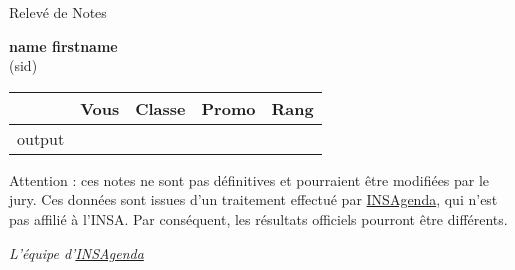 \documentclass[12pt, letterpaper, twoside]{article}
\begin{document}
\begin{center}
    {\huge Relevé de Notes}
    \vspace{1cm}

    \textbf{{name} {firstname}}\\
    ({sid})
    \vspace{.5cm}

    \begin{longtable}{ p{} r r r r }

        & \textbf{Vous} & \textbf{Classe} & \textbf{Promo} & \textbf{Rang} \\ \hline
        
        {output}
    \end{longtable}
\end{center}

\vspace{1cm}

Attention : ces notes ne sont pas définitives et pourraient être modifiées par le jury. Ces données sont issues d'un traitement effectué par \href{https://insagenda.fr/}{INSAgenda}, qui n'est pas affilié à l'INSA. Par conséquent, les résultats officiels pourront être différents.

\vspace{1cm}

\begin{flushright}
    \textit{L'équipe d'\href{https://insagenda.fr/}{INSAgenda}}
\end{flushright}
\end{document}
